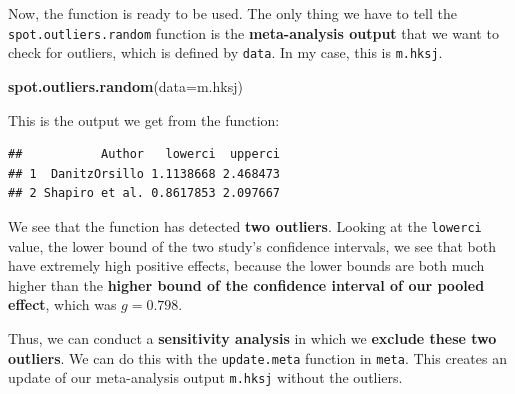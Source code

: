 \documentclass[]{book}
\newenvironment{Shaded}{\begin{snugshade}}{\end{snugshade}}
\newcommand{\ControlFlowTok}[1]{\textcolor[rgb]{0.13,0.29,0.53}{\textbf{#1}}}
\newcommand{\DataTypeTok}[1]{\textcolor[rgb]{0.13,0.29,0.53}{#1}}
\newcommand{\KeywordTok}[1]{\textcolor[rgb]{0.13,0.29,0.53}{\textbf{#1}}}
\newcommand{\NormalTok}[1]{#1}
\newcommand{\OperatorTok}[1]{\textcolor[rgb]{0.81,0.36,0.00}{\textbf{#1}}}
\newcommand{\StringTok}[1]{\textcolor[rgb]{0.31,0.60,0.02}{#1}}
\begin{document}
\begin{Shaded}
\end{Shaded}

Now, the function is ready to be used. The only thing we have to tell the \texttt{spot.outliers.random} function is the \textbf{meta-analysis output} that we want to check for outliers, which is defined by \texttt{data}. In my case, this is \texttt{m.hksj}.

\begin{Shaded}
\begin{Highlighting}[]
\KeywordTok{spot.outliers.random}\NormalTok{(}\DataTypeTok{data=}\NormalTok{m.hksj)}
\end{Highlighting}
\end{Shaded}

This is the output we get from the function:

\begin{verbatim}
##           Author   lowerci  upperci
## 1  DanitzOrsillo 1.1138668 2.468473
## 2 Shapiro et al. 0.8617853 2.097667
\end{verbatim}

We see that the function has detected \textbf{two outliers}. Looking at the \texttt{lowerci} value, the lower bound of the two study's confidence intervals, we see that both have extremely high positive effects, because the lower bounds are both much higher than the \textbf{higher bound of the confidence interval of our pooled effect}, which was \(g = 0.798\).

Thus, we can conduct a \textbf{sensitivity analysis} in which we \textbf{exclude these two outliers}. We can do this with the \texttt{update.meta} function in \texttt{meta}. This creates an update of our meta-analysis output \texttt{m.hksj} without the outliers.
\end{document}
